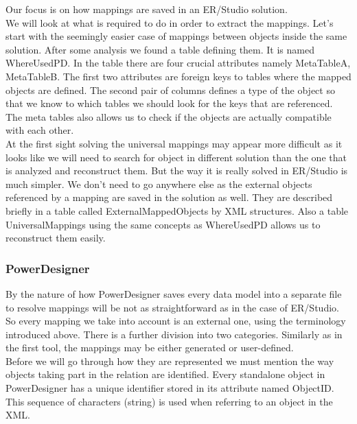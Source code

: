 Our focus is on how mappings are saved in an ER/Studio solution. \\ 

We will look at what is required to do in order to extract the mappings.
Let's start with the seemingly easier case of mappings between objects inside the same solution. After some analysis we found a table defining them. It is named Where\textunderscore Used\textunderscore PD. 
In the table there are four crucial attributes namely  Meta\textunderscore Table\textunderscore A, Meta\textunderscore Table\textunderscore B.
The first two attributes are foreign keys to tables where the mapped objects are defined. The second pair of columns defines a type of the object so that we know to which tables we should look for the keys that are referenced. The meta tables also allows us to check if the objects are actually compatible with each other. \\

At the first sight solving the universal mappings may appear more difficult as it looks like we will need to search for object in different solution than the one that is analyzed and reconstruct them. But the way it is really solved in ER/Studio is much simpler. We don't need to go anywhere else as the external objects referenced by a mapping are saved in the solution as well. They are described briefly in a table called External\textunderscore Mapped\textunderscore Objects by XML structures.
Also a table Universal\textunderscore Mappings using the same concepts as Where\textunderscore Used\textunderscore PD allows us to reconstruct them easily. 

\subsubsection{PowerDesigner}

By the nature of how PowerDesigner saves every data model into a separate file to resolve mappings will be not as straightforward as in the case of ER/Studio.
So every mapping we take into account is an external one, using the terminology introduced above. There is a further division into two categories. Similarly as in the first tool, the mappings may be either generated or user-defined. \\ 

Before we will go through how they are represented we must mention the way objects taking part in the relation are identified.
Every standalone object in PowerDesigner has a unique identifier stored in its attribute named ObjectID. This sequence of characters (string) is used when referring to an object in the XML.\\

